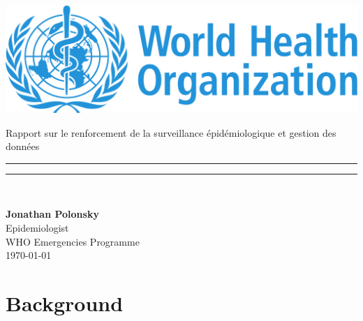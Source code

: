 \documentclass[]{tufte-handout}
\begin{document}
\begin{titlepage}
\hspace*{-1cm}\begin{minipage}[0.1\textheight]{5cm}
\vspace{0pt}
\includegraphics[height=0.1\textheight]{figure/logo_who}
\end{minipage}
\hspace*{1cm}\begin{minipage}{11.3cm}
\vspace{0pt}
\begin{flushright}
\begin{spacing}{1.0}
{\LARGE Rapport sur le renforcement de la surveillance épidémiologique et gestion des données}
\end{spacing}
\end{flushright}
\end{minipage}

\hspace*{-1cm}\begin{minipage}[t]{5cm}
\vspace{0pt}
\textcolor{whoblue!15}{\rule{5cm}{0.577\textheight}}
\end{minipage}
\hspace*{1cm}\begin{minipage}[t]{11.3cm}
\vspace{0pt}
\textcolor{whoblue}{\rule{11.3cm}{0.5mm}}\\[0.465\textheight]
\begin{flushright}
{\Large \bf{Jonathan Polonsky}}\\
{\Large Epidemiologist}\\
{\Large WHO Emergencies Programme}\\[0.5cm]
\cleanlookdateon \textsc{\large \today}
\end{flushright}
\end{minipage}

\end{titlepage}


\section{Background}\label{background}
\end{document}
